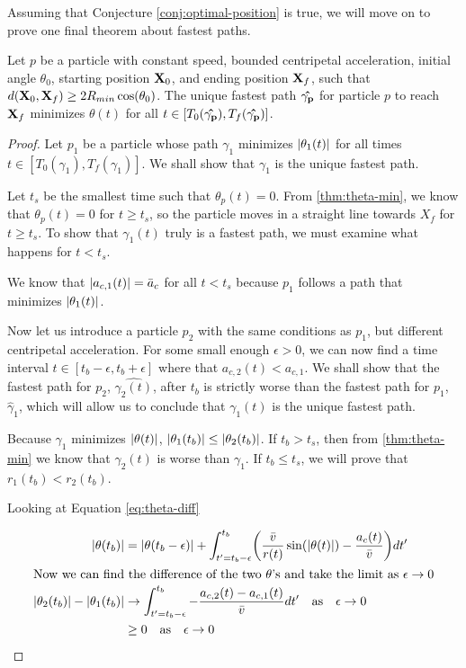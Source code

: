 Assuming that Conjecture \ref{conj:optimal-position} is true, we will move on to prove one final theorem about fastest paths.

\begin{theorem}
  Let  $p$ be a particle with constant speed, bounded centripetal acceleration, initial angle $\theta_0$, starting position $\mathbf{X}_0$, and ending position $\mathbf{X}_f$, such that $d(\bvec{X}_0, \bvec{X}_f) \ge 2 R_{min} \cos\paren{\theta_0}$. The unique fastest path $\mathbf{\hat{\gamma_p}}$ for particle $p$ to reach $\mathbf{X}_f$ minimizes $\theta(t)$ for all $t \in [T_0(\mathbf{\hat{\gamma_p}}), T_f(\mathbf{\hat{\gamma_p}})]$.
  \label{thm:restricted-theta}
\end{theorem}
\begin{proof}
Let $p_1$ be a particle whose path $\gamma_1$ minimizes $\abs{\theta_1(t)}$ for all times $t \in [T_0(\gamma_1), T_f(\gamma_1)]$. We shall show that $\gamma_1$ is the unique fastest path.

Let $t_s$ be the smallest time such that $\theta_p(t) = 0$. From \ref{thm:theta-min}, we know that $\theta_p(t) = 0$ for $t \ge t_s$, so the particle moves in a straight line towards $X_f$ for $t \ge t_s$. To show that $\gamma_1(t)$ truly is a fastest path, we must examine what happens for $t < t_s$.

We know that $\abs{a_{c,1}(t)} = \bar{a}_c$ for all $t < t_s$ because $p_1$ follows a path that minimizes $\abs{\theta_1(t)}$.

Now let us introduce a particle $p_2$ with the same conditions as $p_1$, but different centripetal acceleration. For some small enough $\epsilon > 0$, we can now find a time interval $t \in [t_b-\epsilon, t_b+\epsilon]$ where that $a_{c,2}(t) < a_{c,1}$.  We shall show that the fastest path for $p_2$, $\hat{\gamma_2(t)}$, after $t_b$ is strictly worse than the fastest path for $p_1$, $\hat{\gamma}_1$, which will allow us to conclude that $\gamma_1(t)$ is the unique fastest path.

Because $\gamma_1$ minimizes $\abs{\theta(t)}$, $\abs{\theta_1(t_b)} \le \abs{\theta_2(t_b)}$. If $t_b > t_s$, then from \ref{thm:theta-min} we know that $\gamma_2(t)$ is worse than $\gamma_1$. If $t_b \le t_s$, we will prove that $r_1(t_b) < r_2(t_b)$. 

Looking at Equation \ref{eq:theta-diff}

\begin{align*}
  \abs{\theta(t_b)}& = \abs{\theta(t_b - \epsilon)} + \int_{t' = t_b-\epsilon}^{t_b} \paren{\frac{\bar{v}}{r(t)} \sin(\abs{\theta(t)}) - \frac{a_c(t)}{\bar{v}}} dt'\\
  \intertext{Now we can find the difference of the two $\theta$'s and take the limit as $\epsilon \to 0$}
  \abs{\theta_2(t_b)} - \abs{\theta_1(t_b)}& \to \int_{t' = t_b-\epsilon}^{t_b} - \frac{a_{c,2}(t) - a_{c,1}(t)}{\bar{v}} dt' \quad \text{as} \quad \epsilon \to 0\\
  & \ge 0 \quad \text{as} \quad \epsilon \to 0
\end{align*}


\end{proof}
